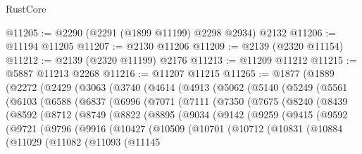 \begin{lexlean}{RustCore}
\begin{coremodule}
@11205 := @2290 (@2291 (@1899 @11199) @2298 @2934) @2132
@11206 := @11194 @11205
@11207 := @2130 @11206
@11209 := @2139 (@2320 @11154)
@11212 := @2139 (@2320 @11199) @2176
@11213 := @11209 @11212
@11215 := @5887 @11213 @2268
@11216 := @11207 @11215
@11265 := @1877
    (@1889
      (@2272
        (@2429
          (@3063
            (@3740
              (@4614
                (@4913
                  (@5062
                    (@5140
                      (@5249
                        (@5561
                          (@6103
                            (@6588
                              (@6837
                                (@6996
                                  (@7071
                                    (@7111
                                      (@7350
                                        (@7675
                                          (@8240
                                            (@8439
                                              (@8592
                                                (@8712
                                                  (@8749
                                                    (@8822
                                                      (@8895
                                                        (@9034
                                                          (@9142
                                                            (@9259
                                                              (@9415
                                                                (@9592
                                                                  (@9721
                                                                    (@9796
                                                                      (@9916
                                                                        (@10427
                                                                          (@10509
                                                                            (@10701
                                                                              (@10712
                                                                                (@10831
                                                                                  (@10884
                                                                                    (@11029
                                                                                      (@11082
                                                                                        (@11093
                                                                                          (@11145

\end{coremodule}
\end{lexlean}
